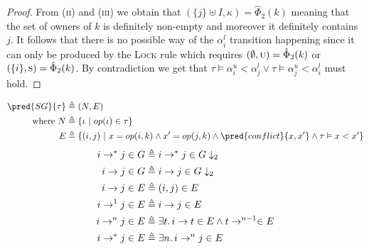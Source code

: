 \begin{proof}
From (\textsc{ii}) and (\textsc{iii}) we obtain that $(\{j\} \uplus I, \kappa) = \hat{\Phi}_2(k)$ meaning that the set of owners of $k$ is definitely non-empty and moreover it definitely contains $j$. It follows that there is no possible way of the $\alpha_i^l$ transition happening since it can only be produced by the \textsc{Lock} rule which requires $(\emptyset, \textsc{u}) = \hat{\Phi}_2(k)$ or $(\{ i \}, \textsc{s}) = \hat{\Phi}_2(k)$. By contradiction we get that $\tau \vDash \alpha_i^u < \alpha_j^l  \lor \tau \vDash \alpha_j^u < \alpha_i^l$ must hold.
\end{proof}

\begin{align*}
\pred{SG}{\tau} &\triangleq (N, E) \\
\text{where } N &\triangleq \{ \iota\ |\ op(\iota) \in \tau \} \\
E &\triangleq \{ (i, j)\ |\ x = op(i, k) \land x' = op(j, k) \land \pred{conflict}{x, x'} \land \tau \vDash x < x' \}
\end{align*}
\begin{align*}
	i \rightarrow^* j \in G &\triangleq i \rightarrow^* j \in G \downarrow_2
\\
	i \rightarrow j \in G &\triangleq i \rightarrow j \in G \downarrow_2
\\
	i \rightarrow j \in E &\triangleq (i, j) \in E
\\
	i \rightarrow^1 j \in E &\triangleq i \rightarrow j \in E
\\
	i \rightarrow^n j \in E &\triangleq \exists t \ldotp i \rightarrow t \in E \land t \rightarrow^{n-1} \in E
\\
	i \rightarrow^* j \in E &\triangleq \exists n \ldotp i \rightarrow^n j \in E
\end{align*}

